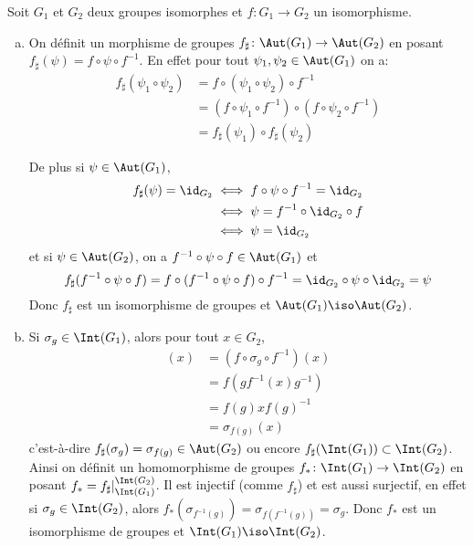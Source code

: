 Soit $G_1$ et $G_2$ deux groupes isomorphes et $f\colon G_1\to G_2$ un
isomorphisme.
%
\begin{enumerate}[a)]
\item On définit un morphisme de groupes $f_\sharp\colon\Aut(G_1)\to\Aut(G_2)$
en posant $f_\sharp(\psi) = f\circ\psi\circ f^{-1}$. En effet pour tout
$\psi_1,\psi_2\in\Aut(G_1)$ on a:
%
\begin{align*}
f_\sharp(\psi_1\circ\psi_2) &= f\circ(\psi_1\circ\psi_2)\circ f^{-1} \\
  &= (f\circ\psi_1\circ f^{-1})\circ(f\circ\psi_2\circ f^{-1}) \\
  &= f_\sharp(\psi_1)\circ f_\sharp(\psi_2)
\end{align*}

De plus si $\psi\in\Aut(G_1)$,
%
\begin{align*}
f_\sharp(\psi) = \id_{G_2} 
  &\iff f\circ\psi\circ f^{-1} = \id_{G_2} \\
  &\iff \psi = f^{-1}\circ\id_{G_2}\circ f \\
  &\iff \psi = \id_{G_2}
\end{align*}
%
et si $\psi\in\Aut(G_2)$, on a $f^{-1}\circ\psi\circ f\in\Aut(G_1)$ et
\[
  f_\sharp(f^{-1}\circ\psi\circ f) = f\circ(f^{-1}\circ\psi\circ f)\circ
  f^{-1} = \id_{G_2}\circ\psi\circ\id_{G_2} = \psi
\]
Donc $f_\sharp$ est un isomorphisme de groupes et $\Aut(G_1)\iso\Aut(G_2)$.

\item Si $\sigma_g\in\Int(G_1)$, alors pour tout $x\in G_2$,
%
\begin{align*}
[f_\sharp(\sigma_g)](x)& = (f\circ\sigma_g\circ f^{-1})(x) \\
  & = f(gf^{-1}(x)g^{-1}) \\
  & = f(g)xf(g)^{-1} \\
  & = \sigma_{f(g)}(x)
\end{align*}
%
c'est-à-dire $f_\sharp(\sigma_g) = \sigma_{f(g)}\in\Aut(G_2)$ ou encore
$f_\sharp(\Int(G_1))\subset\Int(G_2)$. Ainsi on définit un homomorphisme de
groupes $f_*\colon\Int(G_1)\to\Int(G_2)$ en posant 
$f_* = f_\sharp\vert^{\Int(G_2)}_{\Int(G_1)}$. Il est injectif (comme
$f_\sharp$) et est aussi surjectif, en effet si $\sigma_g\in\Int(G_2)$, alors
$f_*(\sigma_{f^{-1}(g)}) = \sigma_{f(f^{-1}(g))} = \sigma_g$. Donc $f_*$ est
un isomorphisme de groupes et $\Int(G_1)\iso\Int(G_2)$.
\end{enumerate}
